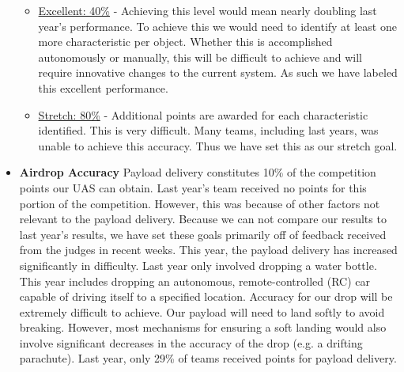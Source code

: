 \documentclass[]{auvsi_doc}
\begin{document}
\begin{itemize}
\begin{itemize}
	\item \underline{Excellent: 40\%} - Achieving this level would mean nearly doubling last year's performance. To achieve this we would need to identify at least one more characteristic per object. Whether this is accomplished autonomously or manually, this will be difficult to achieve and will require innovative changes to the current system. As such we have labeled this excellent performance.
	\item \underline{Stretch: 80\%} - Additional points are awarded for each characteristic identified. This is very difficult. Many teams, including last years, was unable to achieve this accuracy. Thus we have set this as our stretch goal.
	\end{itemize}
\item \textbf{Airdrop Accuracy} Payload delivery constitutes 10\% of the competition points our UAS can obtain. Last year's team received no points for this portion of the competition. However, this was because of other factors not relevant to the payload delivery. Because we can not compare our results to last year's results, we have set these goals primarily off of feedback received from the judges in recent weeks. This year, the payload delivery has increased significantly in difficulty. Last year only involved dropping a water bottle. This year includes dropping an autonomous, remote-controlled (RC) car capable of driving itself to a specified location. Accuracy for our drop will be extremely difficult to achieve. Our payload will need to land softly to avoid breaking. However, most mechanisms for ensuring a soft landing would also involve significant decreases in the accuracy of the drop (e.g. a drifting parachute). Last year, only 29\% of teams received points for payload delivery.


\end{itemize}
\end{document}
